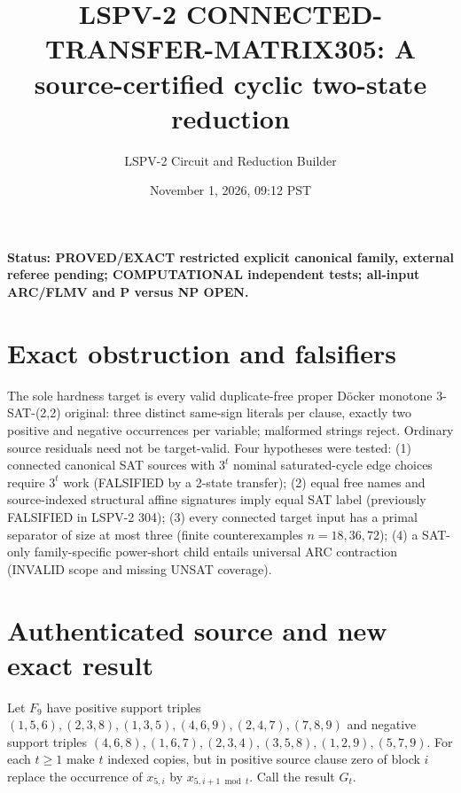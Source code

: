 \documentclass[11pt]{article}
\title{LSPV-2 CONNECTED-TRANSFER-MATRIX305: A source-certified cyclic two-state reduction}
\author{LSPV-2 Circuit and Reduction Builder}
\date{November 1, 2026, 09:12 PST}
\begin{document}
\maketitle
\noindent\textbf{Status: PROVED/EXACT restricted explicit canonical family, external referee pending; COMPUTATIONAL independent tests; all-input ARC/FLMV and P versus NP OPEN.}

\section{Exact obstruction and falsifiers}
The sole hardness target is every valid duplicate-free proper D\"ocker monotone 3-SAT-(2,2) original: three distinct same-sign literals per clause, exactly two positive and negative occurrences per variable; malformed strings reject. Ordinary source residuals need not be target-valid.
Four hypotheses were tested: (1) connected canonical SAT sources with $3^t$ nominal saturated-cycle edge choices require $3^t$ work (FALSIFIED by a 2-state transfer); (2) equal free names and source-indexed structural affine signatures imply equal SAT label (previously FALSIFIED in LSPV-2 304); (3) every connected target input has a primal separator of size at most three (finite counterexamples $n=18,36,72$); (4) a SAT-only family-specific power-short child entails universal ARC contraction (INVALID scope and missing UNSAT coverage).

\section{Authenticated source and new exact result}
Let $F_9$ have positive support triples $(1,5,6),(2,3,8),(1,3,5),(4,6,9),(2,4,7),(7,8,9)$ and negative support triples $(4,6,8),(1,6,7),(2,3,4),(3,5,8),(1,2,9),(5,7,9)$. For each $t\ge1$ make $t$ indexed copies, but in positive source clause zero of block $i$ replace the occurrence of $x_{5,i}$ by $x_{5,i+1\bmod t}$. Call the result $G_t$.
\end{document}
